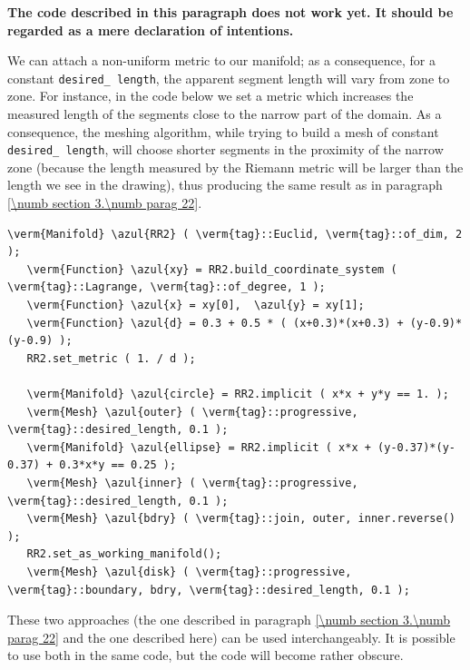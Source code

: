 {\normalfont\bfseries The code described in this paragraph does not work yet.
It should be regarded as a mere declaration of intentions.}
\medskip

We can attach a non-uniform metric to our manifold; as a consequence, for a constant
{\small\tt desired\_\,length}, the apparent segment length will vary from zone to zone.
For instance, in the code below we set a metric which increases the measured length
of the segments close to the narrow part of the domain.
As a consequence, the meshing algorithm, while trying to build a mesh of constant
{\small\tt desired\_\,length}, will choose shorter segments in the proximity of the narrow zone
(because the length measured by the Riemann metric will be larger than the length
we see in the drawing), thus producing the same result as in paragraph
\ref{\numb section 3.\numb parag 22}.

\begin{Verbatim}[commandchars=\\\{\},formatcom=\small\tt,
   baselinestretch=0.94,framesep=2mm                      ]
   \verm{Manifold} \azul{RR2} ( \verm{tag}::Euclid, \verm{tag}::of_dim, 2 );
   \verm{Function} \azul{xy} = RR2.build_coordinate_system ( \verm{tag}::Lagrange, \verm{tag}::of_degree, 1 );
   \verm{Function} \azul{x} = xy[0],  \azul{y} = xy[1];
   \verm{Function} \azul{d} = 0.3 + 0.5 * ( (x+0.3)*(x+0.3) + (y-0.9)*(y-0.9) );
   RR2.set_metric ( 1. / d );
   
   \verm{Manifold} \azul{circle} = RR2.implicit ( x*x + y*y == 1. );
   \verm{Mesh} \azul{outer} ( \verm{tag}::progressive, \verm{tag}::desired_length, 0.1 );
   \verm{Manifold} \azul{ellipse} = RR2.implicit ( x*x + (y-0.37)*(y-0.37) + 0.3*x*y == 0.25 );
   \verm{Mesh} \azul{inner} ( \verm{tag}::progressive, \verm{tag}::desired_length, 0.1 );
   \verm{Mesh} \azul{bdry} ( \verm{tag}::join, outer, inner.reverse() );
   RR2.set_as_working_manifold();
   \verm{Mesh} \azul{disk} ( \verm{tag}::progressive, \verm{tag}::boundary, bdry, \verm{tag}::desired_length, 0.1 );
\end{Verbatim}

These two approaches (the one described in paragraph \ref{\numb section 3.\numb parag 22} and
the one described here) can be used interchangeably.
It is possible to use both in the same code, but the code will become rather obscure.


\section{~~}\label{\numb section 3.\numb parag 24}


